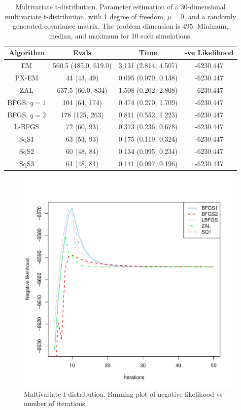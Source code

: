 \documentclass[12pt]{article}
\newcommand{\jx}[1]{{\color{blue}{ #1}}}
\begin{document}
 \begin{table}[!htbp]
\centering
\begin{tabular}{c c c c } 
 \hline
 Algorithm & Evals & Time  & -ve Likelihood\\ [0.5ex] 
 \hline
 EM & 560.5 (485.0, 619.0) & 3.131 (2.814, 4.507) &  -6230.447\\ 
 PX-EM & 44 (43, 49) &  0.095 (0.079, 0.138) & -6230.447 \\
 ZAL &  637.5 (60.0, 834) & 1.508 (0.202, 2.808) & -6230.447 \\
 BFGS, $q=1$ & 104 (64, 174) & 0.474 (0.270, 1.709) &  -6230.447\\
 BFGS, $q=2$ & 178 (125, 263) & 0.811 (0.552, 1.223) & -6230.447\\
 L-BFGS & 72 (60, 93) & 0.373 (0.236, 0.678) & -6230.447 \\
 SqS1 & 63 (53, 93) & 0.175 (0.119, 0.324) & -6230.447\\
 SqS2 & 60 (48, 84) & 0.134 (0.095, 0.234) & -6230.447\\
 SqS3 & 64 (48, 84) & 0.141 (0.097, 0.196) & -6230.447\\
 [1ex] 
 \hline
\end{tabular}
\caption{Multivariate t-distribution. Parameter estimation of a 30-dimensional multivariate t-distribution, with 1 degree of freedom, $\mu = 0$, and a randomly generated covariance matrix. The problem dimension is $495$. Minimum, median, and maximum for 10 such simulations.}
\label{tab:t-dist}
\end{table}

\begin{figure}[!htbp]
    \centering
    \includegraphics[width = .6\textwidth]{plots/multiT-running.pdf}
    \caption{Multivariate t-distribution. Running plot of negative likelihood vs number of iterations \jx{need to fix plot so that likelihood is only decreasing with iteration?}}
    \label{fig:multiT-running}
\end{figure}
\end{document}
